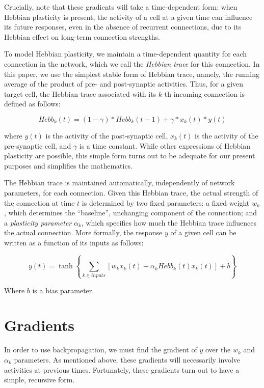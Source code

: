 \documentclass{article}
\begin{document}
Crucially, note that these gradients will take a time-dependent form: when Hebbian
plasticity is present, the activity of a cell at a given time can influence its
future responses, even in the absence of recurrent
connections, due to its Hebbian effect on long-term connection strengths. 

To model Hebbian plasticity, we maintain a time-dependent quantity for each
connection in the network, which we call the \emph{Hebbian trace} for this
connection.  In this paper, we use the simplest stable form of Hebbian trace,
namely, the running average of the product of pre- and post-synaptic
activities.  Thus, for a given target cell, the Hebbian trace associated with
its $k$-th incoming connection is defined as follows:

\begin{equation}
\label{eq:hebb}
Hebb_k(t) = (1-\gamma) * Hebb_k(t-1) + \gamma * x_k(t) * y(t)
\end{equation}

where $y(t)$ is the activity of the post-synaptic cell, $x_k(t)$ is the activity
of the pre-synaptic cell, and $\gamma$ is a time constant. While other
expressions of Hebbian plasticity are possible, this simple form turns out to be
adequate for our present purposes and simplifies the mathematics.

The Hebbian trace is maintained automatically, independently of network
parameters, for each connection. Given this Hebbian trace, the
actual strength of the connection at time $t$ is determined by two fixed parameters: a fixed
weight $w_k$, which determines the ``baseline'', unchanging component of the
connection; and a \emph{plasticity parameter} $\alpha_k$, which specifies how
much the Hebbian trace influences the actual connection. More formally, the
response $y$ of a given cell can be written as a function of its inputs as
follows:

\begin{equation}
\label{eq:y}
y(t) = \tanh\left\{\sum_{k \in inputs}[w_k x_k(t) + \alpha_k Hebb_k(t) x_k(t)] +
b\right\}
\end{equation}


Where $b$ is a bias parameter. 


\section{Gradients}

In order to use backpropagation, we must find the gradient of $y$ over the $w_k$ and
$\alpha_k$ parameters. As mentioned above, these gradients will necessarily
involve activities at previous times. Fortunately, these gradients turn out to
have a simple, recursive form. 
\end{document}
